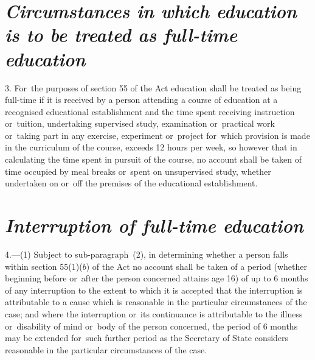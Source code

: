 \documentclass[a4paper,12pt]{article}
\begin{document}


\section*{\itshape Circumstances in which education is to be treated as full-time education}

3.  For~the purposes of section 55 of the Act education shall be treated as being full-time if it is received by a person attending a course of education at a recognised educational establishment and the time spent receiving instruction or~tuition, undertaking supervised study, examination or~practical work or~taking part in any exercise, experiment or~project for~which provision is made in the curriculum of the course, exceeds 12 hours per week, so however that in calculating the time spent in pursuit of the course, no account shall be taken of time occupied by meal breaks or~spent on unsupervised study, whether undertaken on or~off the premises of the educational establishment.

\section*{\itshape Interruption of full-time education}

4.—(1) Subject to sub-paragraph~(2), in determining whether a person falls within section 55(1)($b$) of the Act no account shall be taken of a period (whether beginning before or~after the person concerned attains age 16) of up to 6 months of any interruption to the extent to which it is accepted that the interruption is attributable to a cause which is reasonable in the particular circumstances of the case; and where the interruption or~its continuance is attributable to the illness or~disability of mind or~body of the person concerned, the period of 6 months may be extended for~such further period as 
the Secretary of State  %
considers reasonable in the particular circumstances of the case.

%
\end{document}
